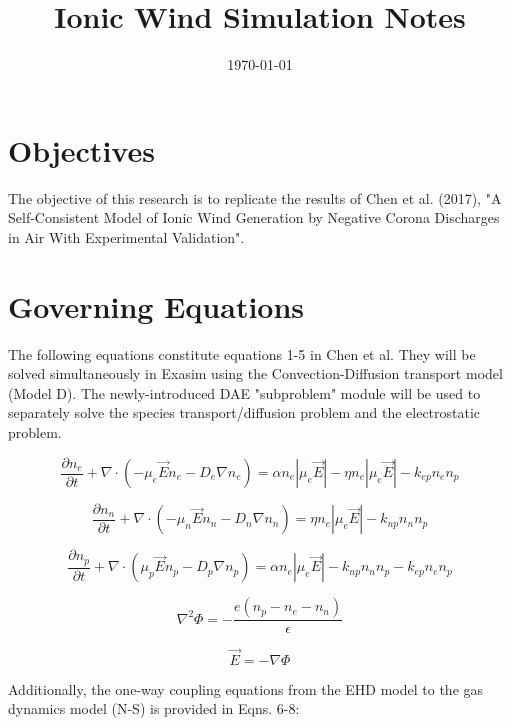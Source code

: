 \documentclass[12pt, a4paper]{report}
\begin{document}
\title{Ionic Wind Simulation Notes}
\date{\today}
\maketitle

\noindent

\section{Objectives}
The objective of this research is to replicate the results of Chen et al. (2017), "A Self-Consistent Model of Ionic Wind Generation by Negative Corona Discharges in Air With Experimental Validation".

\section{Governing Equations}
The following equations constitute equations 1-5 in Chen et al. They will be solved simultaneously in Exasim using the Convection-Diffusion transport model (Model D). The newly-introduced DAE "subproblem" module will be used to separately solve the species transport/diffusion problem and the electrostatic problem.

\begin{equation}
    \frac{\partial n_e}{\partial t} + \nabla \cdot (-\mu_e\vec{E}n_e - D_e\nabla n_e) = \alpha n_e|\mu_e\vec{E}| -\eta n_e|\mu_e\vec{E}| - k_{ep}n_en_p
\end{equation}

\begin{equation}
    \frac{\partial n_n}{\partial t} + \nabla \cdot (-\mu_n\vec{E}n_n - D_n\nabla n_n) = \eta n_e|\mu_e\vec{E}| - k_{np}n_nn_p
\end{equation}

\begin{equation}
    \frac{\partial n_p}{\partial t} + \nabla \cdot (\mu_p\vec{E}n_p - D_p\nabla n_p) = \alpha n_e|\mu_e\vec{E}| - k_{np}n_nn_p - k_{ep}n_en_p
\end{equation}

\begin{equation}
    \nabla^2\Phi = -\frac{e(n_p-n_e-n_n)}{\epsilon}
\end{equation}

\begin{equation}
    \vec{E} = -\nabla\Phi
\end{equation}

Additionally, the one-way coupling equations from the EHD model to the gas dynamics model (N-S) is provided in Eqns. 6-8:
\end{document}
